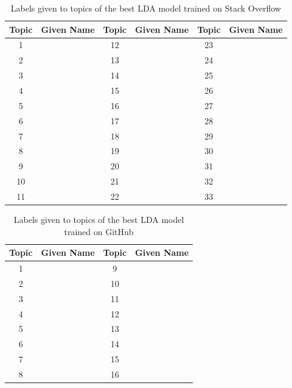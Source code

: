             \begin{table}
              \centering
              \caption{Labels given to topics of the best LDA model trained on Stack Overflow}\label{tab:SO_LDA_labels}
                \vspace{6pt} %
              \begin{tabular}{|c|c|c|c|c|c|}
                \hline
                Topic & Given Name & Topic & Given Name & Topic & Given Name \\
                \hline
                1 & & 12 & & 23 &  \\
                2 & & 13 & & 24 &  \\
                3 & & 14 & & 25 &  \\
                4 & & 15 & & 26 &  \\
                5 & & 16 & & 27 &  \\
                6 & & 17 & & 28 &  \\
                7 & & 18 & & 29 &  \\
                8 & & 19 & & 30 &  \\
                9 & & 20 & & 31 &  \\
                10 & & 21 & & 32 &  \\
                11 & & 22 & & 33 &  \\
                \hline
              \end{tabular}
            \end{table}
            
            \begin{table}
              \centering
              \caption{Labels given to topics of the best LDA model trained on GitHub}\label{tab:GH_LDA_labels}
                \vspace{6pt} %
              \begin{tabular}{|c|c|c|c|}
                \hline
                Topic & Given Name & Topic & Given Name \\
                \hline
                1 & & 9 &  \\
                2 & & 10 &  \\
                3 & & 11 &  \\
                4 & & 12 &  \\
                5 & & 13 &  \\
                6 & & 14 &  \\
                7 & & 15 &  \\
                8 & & 16 &  \\
                \hline
              \end{tabular}
            \end{table}
        
